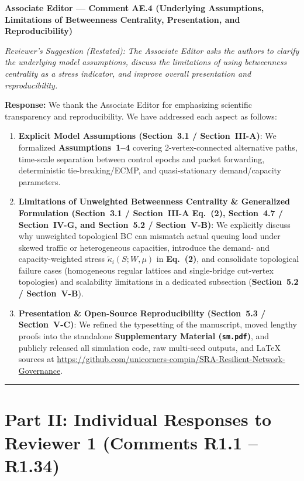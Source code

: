 \documentclass[11pt,a4paper]{article}
\newcommand{\cbox}[2]{%
  \vspace{0.6em}\noindent\textbf{#1}\par\smallskip
  \noindent\textit{Reviewer's Suggestion (Restated):} \textit{#2}\par\smallskip
}
\begin{document}
\hrulefill

\cbox{Associate Editor --- Comment AE.4 (Underlying Assumptions, Limitations of Betweenness Centrality, Presentation, and Reproducibility)}{The Associate Editor asks the authors to clarify the underlying model assumptions, discuss the limitations of using betweenness centrality as a stress indicator, and improve overall presentation and reproducibility.}

\noindent\textbf{Response:} We thank the Associate Editor for emphasizing scientific transparency and reproducibility. We have addressed each aspect as follows:
\begin{enumerate}[leftmargin=1.8em]
    \item \textbf{Explicit Model Assumptions (Section~3.1 / Section~III-A)}: We formalized \textbf{Assumptions~1--4} covering 2-vertex-connected alternative paths, time-scale separation between control epochs and packet forwarding, deterministic tie-breaking/ECMP, and quasi-stationary demand/capacity parameters.
    \item \textbf{Limitations of Unweighted Betweenness Centrality \& Generalized Formulation (Section~3.1 / Section~III-A Eq.~(2), Section~4.7 / Section~IV-G, and Section~5.2 / Section~V-B)}: We explicitly discuss why unweighted topological BC can mismatch actual queuing load under skewed traffic or heterogeneous capacities, introduce the demand- and capacity-weighted stress $\widetilde{\kappa}_i(S; W, \mu)$ in \textbf{Eq.~(2)}, and consolidate topological failure cases (homogeneous regular lattices and single-bridge cut-vertex topologies) and scalability limitations in a dedicated subsection (\textbf{Section~5.2 / Section~V-B}).
    \item \textbf{Presentation \& Open-Source Reproducibility (Section~5.3 / Section~V-C)}: We refined the typesetting of the manuscript, moved lengthy proofs into the standalone \textbf{Supplementary Material (\texttt{sm.pdf})}, and publicly released all simulation code, raw multi-seed outputs, and \LaTeX{} sources at \url{https://github.com/unicorners-compin/SRA-Resilient-Network-Governance}.
\end{enumerate}

\vspace{0.5em}
\hrule
\section*{Part II: Individual Responses to Reviewer 1 (Comments R1.1 -- R1.34)}
\end{document}
